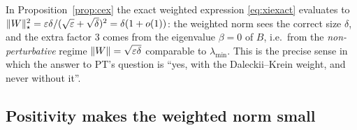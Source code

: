 \documentclass[11pt]{article}
\newcommand{\Nst}[1]{\lVert #1\rVert_{\star}}\newcommand{\Nsto}[1]{\lVert #1\rVert_{\star\star}}\newcommand{\Pinch}{\mathcal P}
\begin{document}
\begin{remark}
In Proposition~\ref{prop:cex} the exact weighted expression \eqref{eq:xiexact} evaluates to
$\Nst{W}^2=\eps\delta/(\sqrt\eps+\sqrt\delta)^2=\delta(1+o(1))$: the weighted norm sees the correct
size $\delta$, and the extra factor $3$ comes from the eigenvalue $\beta=0$ of $B$, i.e.\ from the
\emph{non-perturbative} regime $\|W\|=\sqrt{\varepsilon\delta}$ comparable to $\lambda_{\min}$.  This is the
precise sense in which the answer to PT's question is ``yes, with the Daleckii--Krein weight, and
never without it''.
\end{remark}

\subsection{Positivity makes the weighted norm small}\label{ss:schur}
\end{document}
